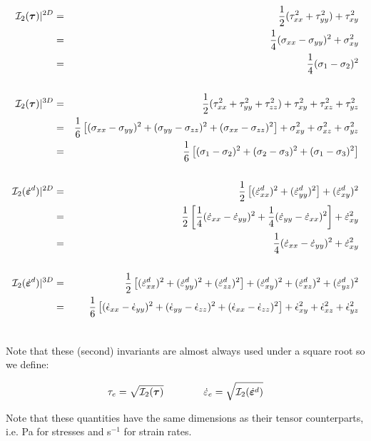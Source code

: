 \begin{eqnarray}
{\cal I}_2({\bm \tau})|^{2D}            
&=& \frac{1}{2} ( \tau_{xx}^2 + \tau_{yy}^2  ) + \tau_{xy}^2   \nonumber\\
&=& \frac{1}{4} (\sigma_{xx} - \sigma_{yy})^2 + \sigma_{xy}^2 \nonumber\\
&=& \frac{1}{4} (\sigma_{1} - \sigma_{2})^2 \nonumber\\
\nonumber\\
{\cal I}_2({\bm \tau})|^{3D}            
&=&\frac{1}{2}(\tau_{xx}^2 + \tau_{yy}^2 + \tau_{zz}^2 ) + \tau_{xy}^2 + \tau_{xz}^2 + \tau_{yz}^2  \nonumber\\
&=&\frac{1}{6}\left[(\sigma_{xx}-\sigma_{yy})^2 + (\sigma_{yy}-\sigma_{zz})^2 + (\sigma_{xx}-\sigma_{zz})^2 \right] 
   + \sigma_{xy}^2 + \sigma_{xz}^2 + \sigma_{yz}^2 \nonumber \\
&=&\frac{1}{6}\left[(\sigma_{1}-\sigma_{2})^2 +(\sigma_{2}-\sigma_{3})^2 + (\sigma_{1}-\sigma_{3})^2 \right] \nonumber\\
\nonumber\\
{\cal I}_2(\dot{\bm{\varepsilon}}^d)|^{2D} 
&=& \frac{1}{2} \left[ (\dot{\varepsilon}_{xx}^d)^2 + (\dot{\varepsilon}_{yy}^d)^2  \right] + (\dot{\varepsilon}_{xy}^d)^2  \nonumber\\
           &=& \frac{1}{2} \left[ 
               \frac{1}{4}(\dot{\varepsilon}_{xx} - \dot{\varepsilon}_{yy})^2 + \frac{1}{4}(\dot{\varepsilon}_{yy} - \dot{\varepsilon}_{xx})^2 
               \right] + \dot{\varepsilon}_{xy}^2  \nonumber\\
           &=& \frac{1}{4} (\dot{\varepsilon}_{xx} - \dot{\varepsilon}_{yy})^2  + \dot{\varepsilon}_{xy}^2  \nonumber\\
\nonumber\\
{\cal I}_2(\dot{\bm{\varepsilon}}^d)|^{3D} 
&=& \frac{1}{2} \left[ (\dot{\varepsilon}_{xx}^d)^2 + (\dot{\varepsilon}_{yy}^d)^2 + (\dot{\varepsilon}_{zz}^d)^2   \right] 
+ (\dot{\varepsilon}_{xy}^d)^2  
+ (\dot{\varepsilon}_{xz}^d)^2  
+ (\dot{\varepsilon}_{yz}^d)^2  \nonumber\\
           &=& \frac{1}{6} \left[ (\dot{\epsilon}_{xx}-\dot{\epsilon}_{yy})^2 + (\dot{\epsilon}_{yy}-\dot{\epsilon}_{zz})^2 + (\dot{\epsilon}_{xx}-\dot{\epsilon}_{zz})^2 \right] 
               + \dot{\epsilon}_{xy}^2 + \dot{\epsilon}_{xz}^2 + \dot{\epsilon}_{yz}^2 \nonumber \\
\nonumber
\end{eqnarray}

Note that these (second) invariants are almost always used under a square root so we define:
\begin{mdframed}[backgroundcolor=blue!5]
\[
\tau_{e}=\sqrt{{\cal I}_2({\bm \tau})}
\quad\quad
\quad\quad
\dot{\varepsilon}_{e}=\sqrt{{\cal I}_2(\dot{\bm \varepsilon}^d)}
\]
\end{mdframed}
Note that these quantities have the same dimensions as their tensor counterparts, i.e. Pa for stresses and s$^{-1}$ for strain rates.



